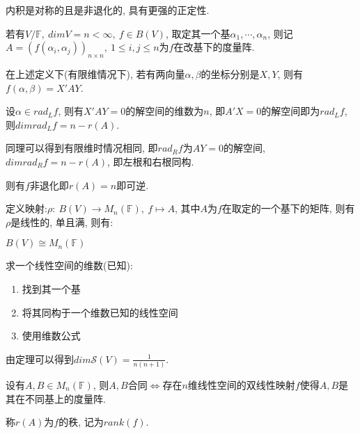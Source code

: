 \begin{example}
    内积是对称的且是非退化的, 具有更强的正定性.
\end{example}

\begin{definition}[度量阵]
    若有$V/\mathbb{F},\ dimV=n<\infty,\ f\in B(V)$, 取定其一个基$\alpha{_1},\cdots,\alpha{_n}$, 则记$A=(f(\alpha{_i}, \alpha{_j}))_{n\times n},\ 1\le i,j\le n$为$f$在改基下的度量阵.
\end{definition}

\begin{statement}
    在上述定义下(有限维情况下), 若有两向量$\alpha, \beta$的坐标分别是$X, Y$, 则有$f(\alpha, \beta)=X'AY$.\par
    设$\alpha \in rad_Lf$, 则有$X'AY=0$的解空间的维数为$n$, 即$A'X=0$的解空间即为$rad_Lf$, 则$dimrad_Lf=n-r(A)$.\par
    同理可以得到有限维时情况相同, 即$rad_Rf$为$AY=0$的解空间, $dimrad_Rf=n-r(A)$, 即左根和右根同构.\par
    则有$f$非退化即$r(A)=n$即可逆.
\end{statement}

\begin{theorem}
    定义映射:$\rho:\ B(V)\to M_n(\mathbb{F}),\ f\mapsto A$, 其中$A$为$f$在取定的一个基下的矩阵, 则有$\rho$是线性的, 单且满, 则有:\par
    $B(V)\cong M_n(\mathbb{F})$
\end{theorem}

\begin{statement}
    求一个线性空间的维数(已知):
    \begin{enumerate}[itemindent=1em]
        \item 找到其一个基
        \item 将其同构于一个维数已知的线性空间
        \item 使用维数公式
    \end{enumerate}
\end{statement}

\begin{example}
    由定理可以得到$dim\mathscr{S}(V)=\frac{1}{n(n+1)}$.
\end{example}

\begin{theorem}[双线性映射的秩]
    设有$A,B\in M_n(\mathbb{F})$, 则$A,B$合同$\Longleftrightarrow$存在$n$维线性空间的双线性映射$f$使得$A,B$是其在不同基上的度量阵.\par
    称$r(A)$为$f$的秩, 记为$rank(f)$.
\end{theorem}

